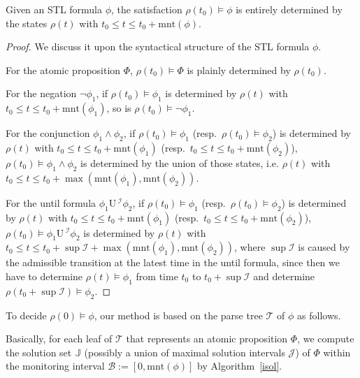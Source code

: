 \documentclass[a4paper,UKenglish,cleveref,autoref,thm-restate,authorcolumns]{lipics-v2019}
\newcommand{\I}{\mathcal{I}}
\newcommand{\J}{\mathcal{J}}
\newcommand{\JJ}{\mathbb{J}}
\newcommand{\ntl}{\mathrm{U}\,}
\newcommand{\mnt}{\mathrm{mnt}}
\begin{document}
\begin{lemma}\label{lem:mnt}
	Given an STL formula $\phi$,
	the satisfaction $\rho(t_0) \models \phi$ is entirely determined by
	the states $\rho(t)$ with $t_0 \le t \le t_0+\mnt(\phi)$.
\end{lemma}
\begin{proof}
	We discuss it upon the syntactical structure of the STL formula $\phi$.
	
	For the atomic proposition $\Phi$,
	$\rho(t_0) \models \Phi$ is plainly determined by $\rho(t_0)$.
	    	
	For the negation $\neg\phi_1$,
	if $\rho(t_0) \models \phi_1$
	is determined by $\rho(t)$ with $t_0 \le t \le t_0+\mnt(\phi_1)$,
	so is $\rho(t_0) \models \neg\phi_1$.
			
	For the conjunction $\phi_1 \wedge \phi_2$,
	if $\rho(t_0) \models \phi_1$ (resp.~$\rho(t_0) \models \phi_2$)
	is determined by $\rho(t)$ with $t_0 \le t \le t_0+\mnt(\phi_1)$
	(resp.~$t_0 \le t \le t_0+\mnt(\phi_2)$),
	$\rho(t_0) \models \phi_1 \wedge \phi_2$ is determined by the union of those states,
	i.e. $\rho(t)$ with $t_0 \le t \le t_0+\max(\mnt(\phi_1),\mnt(\phi_2))$.
			
	For the until formula $\phi_1 \ntl^\I \phi_2$,
	if $\rho(t_0) \models \phi_1$ (resp.~$\rho(t_0) \models \phi_2$)
	is determined by $\rho(t)$ with $t_0 \le t \le t_0+\mnt(\phi_1)$
	(resp.~$t_0 \le t \le t_0+\mnt(\phi_2)$),
	$\rho(t_0) \models \phi_1 \ntl^\I \phi_2$ is determined by
	$\rho(t)$ with $t_0 \le t \le t_0+\sup\I+\max(\mnt(\phi_1),\mnt(\phi_2))$,
	where $\sup\I$ is caused by the admissible transition at the latest time in the until formula,
	since then we have to determine $\rho(t) \models \phi_1$ from time $t_0$ to $t_0+\sup\I$
	and determine $\rho(t_0+\sup\I) \models \phi_2$.
\end{proof}
	
To decide $\rho(0) \models \phi$,
our method is based on the parse tree $\mathcal{T}$ of $\phi$ as follows.

Basically, for each leaf of $\mathcal{T}$
that represents an atomic proposition $\Phi$,
we compute the solution set $\JJ$ (possibly a union of maximal solution intervals $\J$)
of $\Phi$ within the monitoring interval $\mathcal{B}:=[0,\mnt(\phi)]$
by Algorithm~\ref{isol}.
\end{document}
